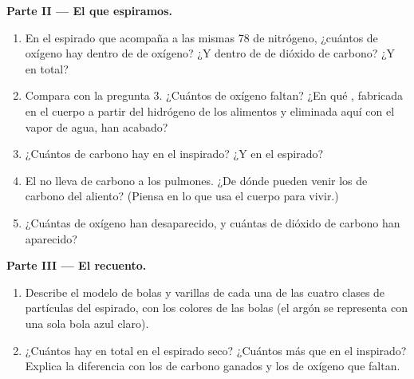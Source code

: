 \begin{problem}
\medskip
\noindent\textbf{Parte II --- El  que espiramos.}
\begin{enumerate}[resume]
  \item En el  espirado que acompaña a las mismas 78  de
        nitrógeno, ¿cuántos  de oxígeno hay dentro de  de
        oxígeno? ¿Y dentro de  de dióxido de carbono? ¿Y en
        total?
  \item Compara con la pregunta 3. ¿Cuántos  de oxígeno faltan?
        ¿En qué , fabricada en el cuerpo a partir del hidrógeno
        de los alimentos y eliminada aquí con el vapor de agua, han
        acabado?
  \item ¿Cuántos  de carbono hay en el  inspirado? ¿Y en el
         espirado?
  \item El  no lleva  de carbono a los pulmones. ¿De dónde
        pueden venir los  de carbono del aliento? (Piensa en lo
        que usa el cuerpo para vivir.)
  \item ¿Cuántas  de oxígeno han desaparecido, y cuántas
         de dióxido de carbono han aparecido?
\end{enumerate}

\medskip
\noindent\textbf{Parte III --- El recuento.}
\begin{enumerate}[resume]
  \item Describe el modelo de bolas y varillas de cada una de las cuatro
        clases de partículas del  espirado, con los colores de las
        bolas (el argón se representa con una sola bola azul claro).
  \item ¿Cuántos  hay en total en el  espirado seco? ¿Cuántos
         más que en el  inspirado? Explica la diferencia con
        los  de carbono ganados y los  de oxígeno que
        faltan.
\end{enumerate}
\end{problem}
